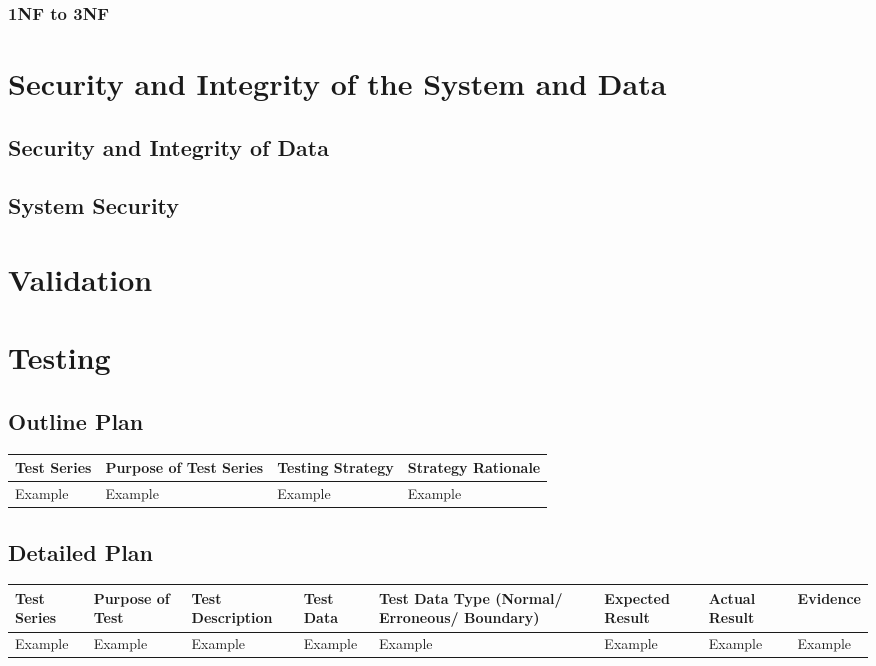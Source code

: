 \subsubsection{1NF to 3NF}

\section{Security and Integrity of the System and Data}

\subsection{Security and Integrity of Data}

\subsection{System Security}

\section{Validation}

\section{Testing}

\begin{landscape}
\subsection{Outline Plan}

\begin{center}
    \begin{tabular}{|p{2cm}|p{5cm}|p{5cm}|p{4cm}|}
        \hline
        \textbf{Test Series} & \textbf{Purpose of Test Series} & \textbf{Testing Strategy} & \textbf{Strategy Rationale}\\ \hline
        Example & Example & Example & Example \\ \hline
    \end{tabular}
\end{center}

\subsection{Detailed Plan}

\begin{center}
    \begin{longtable}{|p{1.5cm}|p{2.5cm}|p{2.5cm}|p{2cm}|p{2cm}|p{2cm}|p{2cm}|p{2cm}|}
        \hline
        \textbf{Test Series} & \textbf{Purpose of Test} & \textbf{Test Description} & \textbf{Test Data} & \textbf{Test Data Type (Normal/ Erroneous/ Boundary)} & \textbf{Expected Result} & \textbf{Actual Result} & \textbf{Evidence}\\ \hline
        Example & Example & Example & Example & Example & Example & Example & Example \\ \hline
    \end{longtable}
\end{center}
\end{landscape}